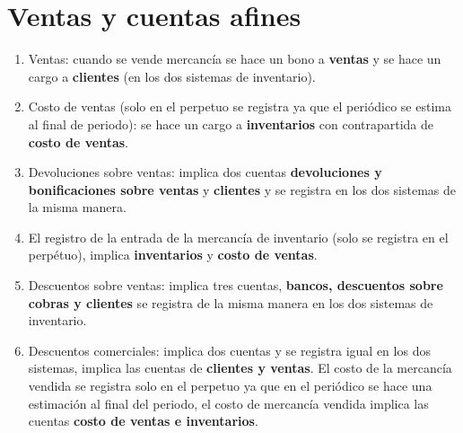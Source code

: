 \documentclass{article}
\begin{document}
\section{Ventas y cuentas afines}
\begin{enumerate}
    \item Ventas: cuando se vende mercancía se hace un bono a \textbf{ventas} y se hace un cargo a \textbf{clientes} (en los dos sistemas de inventario).
    \item Costo de ventas (solo en el perpetuo se registra ya que el periódico se estima al final de periodo): se hace un cargo a \textbf{inventarios} con contrapartida de \textbf{costo de ventas}.
    \item Devoluciones sobre ventas: implica dos cuentas \textbf{devoluciones y bonificaciones sobre ventas} y \textbf{clientes} y se registra en los dos sistemas de la misma manera.
    \item El registro de la entrada de la mercancía de inventario (solo se registra en el perpétuo), implica \textbf{inventarios} y \textbf{costo de ventas}.
    \item Descuentos sobre ventas: implica tres cuentas, \textbf{bancos, descuentos sobre cobras y clientes} se registra de la misma manera en los dos sistemas de inventario.
    \item Descuentos comerciales: implica dos cuentas y se registra igual en los dos sistemas, implica las cuentas de \textbf{clientes y ventas}. El costo de la mercancía vendida se registra solo en el perpetuo ya que en el periódico se hace una estimación al final del periodo, el costo de mercancía vendida implica las cuentas \textbf{costo de ventas e inventarios}.
\end{enumerate}
\end{document}

